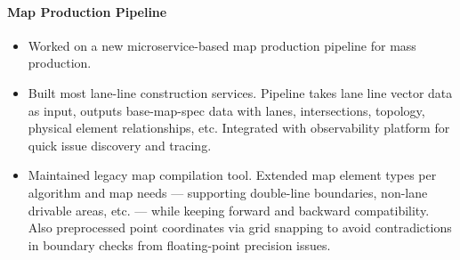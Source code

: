 \paragraph{Map Production Pipeline}
\begin{itemize}
      \item Worked on a new microservice-based map production pipeline for mass production.
      \item Built most lane-line construction services.
            Pipeline takes lane line vector data as input,
            outputs base-map-spec data with lanes, intersections, topology, physical element relationships, etc.
            Integrated with observability platform for quick issue discovery and tracing.
      \item Maintained legacy map compilation tool.
            Extended map element types per algorithm and map needs ---
            supporting double-line boundaries, non-lane drivable areas, etc. ---
            while keeping forward and backward compatibility.
            Also preprocessed point coordinates via grid snapping to avoid contradictions in boundary checks from floating-point precision issues.
\end{itemize}
